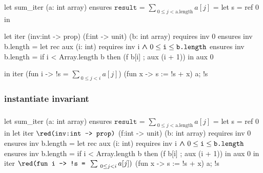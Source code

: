 \begin{frame}[fragile]
\frametitle{}
\vspace*{0em}
\begin{footnotesize}
\begin{whygray}
let sum_iter (a: int array) 
ensures { $\texttt{result = }\sum_{~0 \leq j < \text{a.length}} a[j]$ }
= let s = ref 0 in 
\end{whygray}\vspace*{-1.15em} 
\begin{whycode}
  let iter (inv:int -> prop) (f:int -> unit) (b: int array)
  requires { inv 0 } 
  ensures  { inv b.length } 
  = let rec aux (i: int)
    requires { inv i$\boldsymbol{~\wedge~} 0 \leq \texttt{i} \leq \texttt{b.length}$ }
    ensures  { inv b.length }
    = if i < Array.length b
      then (f b[i] ; aux (i + 1)) 
    in aux 0 \end{whycode} \vspace*{-1.15em} 
 \begin{whygray}
  in iter (fun i -> !s = $\sum_{~0\leq j < i} a[j]$) (fun x -> s := !s + x) a; 
  !s
\end{whygray}
\end{footnotesize}
\end{frame}
\addtocounter{framenumber}{-1}


\subsubsection*{instantiate invariant}
\begin{frame}[fragile]
\frametitle{}
\vspace*{0em}
\begin{footnotesize}
\begin{whycode}
let sum_iter (a: int array) 
ensures { $\texttt{result = }\sum_{~0 \leq j < \text{a.length}} a[j]$ }
= let s = ref 0 in 
  let iter ${\red \texttt{(inv:int -> prop)}}$ (f:int -> unit) (b: int array)
  requires { inv 0 } 
  ensures  { inv b.length } 
  = let rec aux (i: int)
    requires { inv i$\boldsymbol{~\wedge~} 0 \leq \texttt{i} \leq \texttt{b.length}$ }
    ensures  { inv b.length }
    = if i < Array.length b
      then (f b[i] ; aux (i + 1)) 
    in aux 0
  in iter ${\red \texttt{(fun i -> !s = } \sum_{~0\leq j < i} a[j])}$ (fun x -> s := !s + x) a; 
  !s
\end{whycode}
\end{footnotesize}
\end{frame}
\addtocounter{framenumber}{-1}


